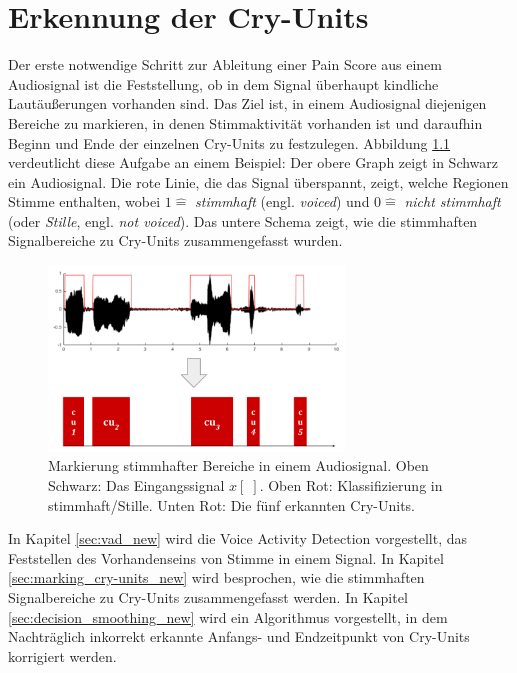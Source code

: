 \chapter{Erkennung der Cry-Units}
\label{sec:vad}

Der erste notwendige Schritt zur Ableitung einer Pain Score aus einem Audiosignal ist die Feststellung, ob in dem Signal überhaupt kindliche Lautäußerungen vorhanden sind. Das Ziel ist, in einem Audiosignal diejenigen Bereiche zu markieren, in denen Stimmaktivität vorhanden ist und daraufhin Beginn und Ende der einzelnen Cry-Units zu festzulegen. Abbildung  \ref{img:vad01} verdeutlicht diese Aufgabe an einem Beispiel: Der obere Graph zeigt in Schwarz ein Audiosignal. Die rote Linie, die das Signal überspannt, zeigt, welche Regionen Stimme enthalten, wobei $1 \hat{=} $ \emph{stimmhaft} (engl. \emph{voiced}) und $0 \hat{=}  $ \emph{nicht stimmhaft} (oder \emph{Stille}, engl. \emph{not voiced}). Das untere Schema zeigt, wie die stimmhaften Signalbereiche zu Cry-Units zusammengefasst wurden.

\begin{figure}[h]
	\centering
	\includegraphics[width=0.7\textwidth]{bilder/vad_introduction02.png}
	\caption{Markierung stimmhafter Bereiche in einem Audiosignal. Oben Schwarz: Das Eingangssignal $x[\;]$. Oben Rot: Klassifizierung in stimmhaft/Stille. Unten Rot: Die fünf erkannten Cry-Units.}
	\label{img:vad01}
\end{figure}

In Kapitel \ref{sec:vad_new} wird die Voice Activity Detection vorgestellt, das Feststellen des Vorhandenseins von Stimme in einem Signal. In Kapitel \ref{sec:marking_cry-units_new} wird besprochen, wie die stimmhaften Signalbereiche zu Cry-Units zusammengefasst werden. In Kapitel \ref{sec:decision_smoothing_new} wird ein Algorithmus vorgestellt, in dem Nachträglich inkorrekt erkannte Anfangs- und Endzeitpunkt von Cry-Units korrigiert werden.

